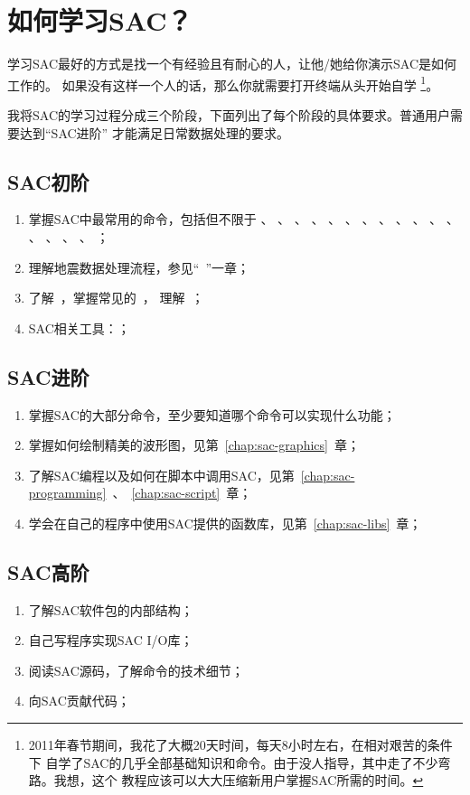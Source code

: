 \section{如何学习SAC？}
学习SAC最好的方式是找一个有经验且有耐心的人，让他/她给你演示SAC是如何工作的。
如果没有这样一个人的话，那么你就需要打开终端从头开始自学
\footnote{2011年春节期间，我花了大概20天时间，每天8小时左右，在相对艰苦的条件下
    自学了SAC的几乎全部基础知识和命令。由于没人指导，其中走了不少弯路。我想，这个
    教程应该可以大大压缩新用户掌握SAC所需的时间。}。

我将SAC的学习过程分成三个阶段，下面列出了每个阶段的具体要求。普通用户需要达到``SAC进阶''
才能满足日常数据处理的要求。

\subsection*{SAC初阶}
\begin{enumerate}
    \item 掌握SAC中最常用的命令，包括但不限于
            、
            、
            、
            、
            、
            、
            、
            、
            、
            、
            、
            、
            、
            、
            、
            、
            ；
        \item 理解地震数据处理流程，参见``~''一章；
        \item 了解~，掌握常见的~，
            理解~；
        \item SAC相关工具：；
\end{enumerate}

\subsection*{SAC进阶}
\begin{enumerate}
\item 掌握SAC的大部分命令，至少要知道哪个命令可以实现什么功能；
\item 掌握如何绘制精美的波形图，见第~\ref{chap:sac-graphics}~章；
\item 了解SAC编程以及如何在脚本中调用SAC，见第~\ref{chap:sac-programming}~、~\ref{chap:sac-script}~章；
\item 学会在自己的程序中使用SAC提供的函数库，见第~\ref{chap:sac-libs}~章；
\end{enumerate}

\subsection*{SAC高阶}
\begin{enumerate}
\item 了解SAC软件包的内部结构；
\item 自己写程序实现SAC I/O库；
\item 阅读SAC源码，了解命令的技术细节；
\item 向SAC贡献代码；
\end{enumerate}
